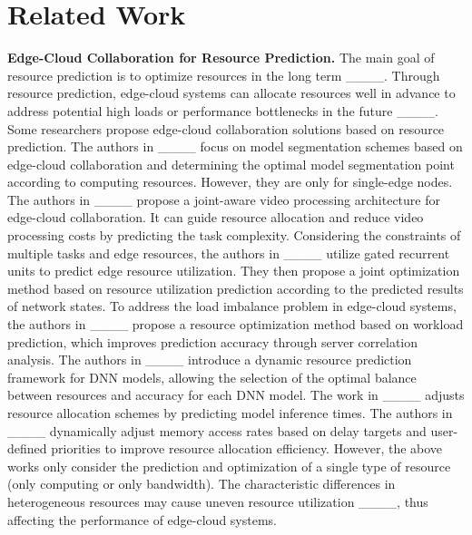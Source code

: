 \section{Related Work}
\textbf{Edge-Cloud Collaboration for Resource Prediction.} 
The main goal of resource prediction is to optimize resources in the long term ____. Through resource prediction, edge-cloud systems can allocate resources well in advance to address potential high loads or performance bottlenecks in the future ____. Some researchers propose edge-cloud collaboration solutions based on resource prediction. The authors in ____ focus on model segmentation schemes based on edge-cloud collaboration and determining the optimal model segmentation point according to computing resources. However, they are only for single-edge nodes. The authors in ____ propose a joint-aware video processing architecture for edge-cloud collaboration. It can guide resource allocation and reduce video processing costs by predicting the task complexity. Considering the constraints of multiple tasks and edge resources, the authors in ____ utilize gated recurrent units to predict edge resource utilization. They then propose a joint optimization method based on resource utilization prediction according to the predicted results of network states. To address the load imbalance problem in edge-cloud systems, the authors in ____ propose a resource optimization method based on workload prediction, which improves prediction accuracy through server correlation analysis. The authors in ____ introduce a dynamic resource prediction framework for DNN models, allowing the selection of the optimal balance between resources and accuracy for each DNN model. The work in ____ adjusts resource allocation schemes by predicting model inference times. The authors in ____ dynamically adjust memory access rates based on delay targets and user-defined priorities to improve resource allocation efficiency. However, the above works only consider the prediction and optimization of a single type of resource (only computing or only bandwidth). The characteristic differences in heterogeneous resources may cause uneven resource utilization ____, thus affecting the performance of edge-cloud systems.

